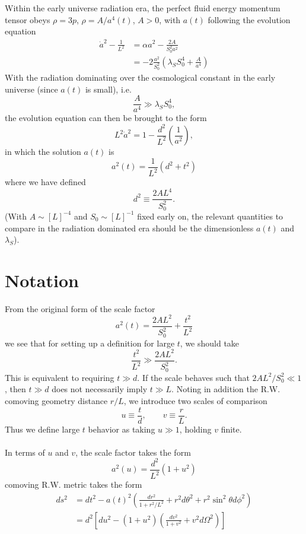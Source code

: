 \documentclass[10pt,letterpaper]{article}
\begin{document}
Within the early universe radiation era,  the perfect fluid energy momentum tensor obeys $\rho = 3p$, $\rho = A/a^4(t)$, $A>0$, with $a(t)$ following the evolution equation
\begin{align}
 \dot a^2 - \frac{1}{L^2}&= \alpha a^2 - \frac{2A}{S_0^2a^2}\nonumber\\
&= -2\frac{a^2}{S_0^2} \left( \lambda_S S_0^4 + \frac{A}{a^4}\right) 
\end{align}
With the radiation dominating over the cosmological constant in the early universe (since $a(t)$ is small), i.e.
\begin{equation}
\frac{A}{a^4} \gg \lambda_S S_0^4,
\end{equation}
the evolution equation can then be brought to the form
\begin{equation}
L^2 \dot a^2 = 1- \frac{d^2}{L^2} \left(\frac{1}{a^2}\right),
\end{equation}
in which the solution $a(t)$ is
\begin{equation}
a^2(t) = \frac{1}{L^2}(d^2+t^2)
\end{equation}
where we have defined
\begin{equation}
d^2 \equiv \frac{2AL^4}{S_0^2}.
\end{equation}
(With $A \sim [L]^{-4}$ and $S_0 \sim [L]^{-1}$ fixed early on, the relevant quantities to compare in the radiation dominated era should be the dimensionless $a(t)$ and $\lambda_S$). 
\section*{Notation}
From the original form of the scale factor
\begin{equation}
a^2(t) = \frac{2A L^2}{S_0^2} + \frac{t^2}{L^2} 
\end{equation}
we see that for setting up a definition for large $t$, we should take
\begin{equation}
\frac{t^2}{L^2} \gg \frac{2A L^2}{S_0^2}.
\end{equation}
This is equivalent to requiring $t\gg d$. If the scale behaves such that $2AL^2 /S_0^2 \ll 1$, then $t\gg d$ does not necessarily imply $t \gg L$. Noting in addition the R.W. comoving geometry distance $r/L$, we introduce two scales of comparison 
\begin{equation}
u \equiv \frac{t}{d},\qquad v \equiv \frac{r}{L}.
\end{equation}
Thus we define large $t$ behavior as taking $u\gg 1$, holding $v$ finite. \\ \\
In terms of $u$ and $v$, the scale factor takes the form
\begin{equation}
a^2(u) = \frac{d^2}{L^2}(1+u^2)
\end{equation}
comoving R.W. metric takes the form
\begin{align}
ds^2 &=  dt^2 - a(t)^2 \left(  \frac{dr^2}{1+r^2/L^2} + r^2 d\theta^2 + r^2\sin^2\theta d\phi^2 \right)\nonumber\\
&= d^2 \left[ du^2 - (1+u^2)\left( \frac{dv^2}{1+v^2} + v^2 d\Omega^2\right)\right] 
\end{align}
\end{document}
